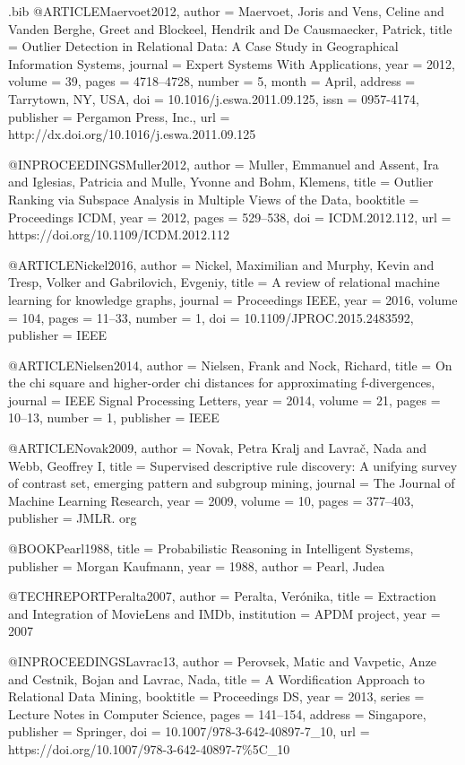 {\begin{filecontents}{\jobname.bib}
@ARTICLE{Maervoet2012,
  author = {Maervoet, Joris and Vens, Celine and {Vanden Berghe}, Greet and Blockeel,
	Hendrik and {De Causmaecker}, Patrick},
  title = {Outlier Detection in Relational Data: A Case Study in Geographical
	Information Systems},
  journal = {Expert Systems With Applications},
  year = {2012},
  volume = {39},
  pages = {4718--4728},
  number = {5},
  month = {April},
  address = {Tarrytown, NY, USA},
  doi = {10.1016/j.eswa.2011.09.125},
  issn = {0957-4174},
  publisher = {Pergamon Press, Inc.},
  url = {http://dx.doi.org/10.1016/j.eswa.2011.09.125}
}

@INPROCEEDINGS{Muller2012,
  author = {Muller, Emmanuel and Assent, Ira and Iglesias, Patricia and Mulle,
	Yvonne and Bohm, Klemens},
  title = {Outlier Ranking via Subspace Analysis in Multiple Views of the Data},
  booktitle = {Proceedings ICDM},
  year = {2012},
  pages = {529--538},
  doi = {ICDM.2012.112},
  url = {https://doi.org/10.1109/ICDM.2012.112}
}

@ARTICLE{Nickel2016,
  author = {Nickel, Maximilian and Murphy, Kevin and Tresp, Volker and Gabrilovich,
	Evgeniy},
  title = {{A review of relational machine learning for knowledge graphs}},
  journal = {Proceedings IEEE},
  year = {2016},
  volume = {104},
  pages = {11--33},
  number = {1},
  doi = {10.1109/JPROC.2015.2483592},
  publisher = {IEEE}
}

@ARTICLE{Nielsen2014,
  author = {Nielsen, Frank and Nock, Richard},
  title = {{On the chi square and higher-order chi distances for approximating
	f-divergences}},
  journal = {IEEE Signal Processing Letters},
  year = {2014},
  volume = {21},
  pages = {10--13},
  number = {1},
  publisher = {IEEE}
}

@ARTICLE{Novak2009,
  author = {Novak, Petra Kralj and Lavra{\v{c}}, Nada and Webb, Geoffrey I},
  title = {{Supervised descriptive rule discovery: A unifying survey of contrast
	set, emerging pattern and subgroup mining}},
  journal = {The Journal of Machine Learning Research},
  year = {2009},
  volume = {10},
  pages = {377--403},
  publisher = {JMLR. org}
}

@BOOK{Pearl1988,
  title = {{Probabilistic Reasoning in Intelligent Systems}},
  publisher = {Morgan Kaufmann},
  year = {1988},
  author = {Pearl, Judea}
}

@TECHREPORT{Peralta2007,
  author = {Peralta, Ver{\'{o}}nika},
  title = {{Extraction and Integration of MovieLens and IMDb}},
  institution = {APDM project},
  year = {2007}
}

@INPROCEEDINGS{Lavrac13,
  author = {Perovsek, Matic and Vavpetic, Anze and Cestnik, Bojan and Lavrac,
	Nada},
  title = {A Wordification Approach to Relational Data Mining},
  booktitle = {Proceedings DS},
  year = {2013},
  series = {Lecture Notes in Computer Science},
  pages = {141--154},
  address = {Singapore},
  publisher = {Springer},
  doi = {10.1007/978-3-642-40897-7_10},
  url = {https://doi.org/10.1007/978-3-642-40897-7{\%}5C{\_}10}
}


\end{filecontents}}
